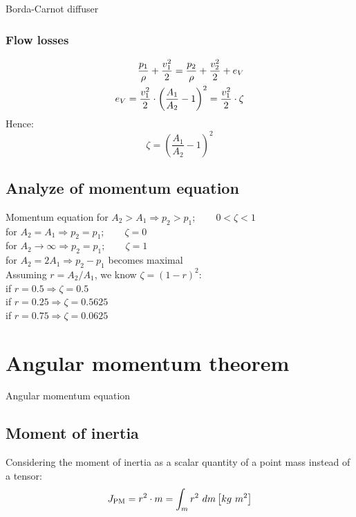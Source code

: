 \documentclass{article}
\begin{document}
\newpage
\begin{multicols}{2}
\setlength{\columnsep}{1pt}

\begin{examplebox}{Borda-Carnot diffuser}
    \subsubsection{Flow losses}
    \vspace{-0.5cm}
    \begin{align}
        \frac{p_1}{\rho} + \frac{v_1^2}{2} = \frac{p_2}{\rho} + \frac{v_2^2}{2} + e_V \notag \\
        e_V = \frac{v_1^2}{2} \cdot \left(\frac{A_1}{A_2}-1\right)^2 = \frac{v_1^2}{2}\cdot \zeta
    \end{align}
    Hence:
    \begin{equation}
        \zeta = \left(\frac{A_1}{A_2}-1\right)^2
    \end{equation}
\end{examplebox}

\subsection{Analyze of momentum equation}
\begin{theorybox}{Momentum equation}
    for $A_2 > A_1 \Longrightarrow p_2 > p_1;\qquad 0 < \zeta < 1$\\[1ex]
    for $A_2 = A_1 \Longrightarrow p_2 = p_1;\qquad \zeta = 0$\\[1ex]
    for $A_2 \to \infty \Longrightarrow p_2 = p_1;\qquad \zeta = 1$\\[1ex]
    for $A_2 = 2A_1 \Longrightarrow p_2 - p_1$ becomes maximal\\[3ex]
    Assuming $r=A_2/A_1$, we know $\zeta = \left(1-r\right)^2:$\\[1ex]
    if $r = 0.5 \Longrightarrow \zeta = 0.5$\\[1ex]
    if $r = 0.25 \Longrightarrow \zeta = 0.5625$\\[1ex]
    if $r = 0.75 \Longrightarrow \zeta = 0.0625$
\end{theorybox}

\section{Angular momentum theorem}
\begin{theorybox}{Angular momentum equation}
    \subsection{Moment of inertia}
    Considering the moment of inertia as a scalar quantity of a point mass
    instead of a tensor:
    \begin{equation}
        J_{\rm PM} = r^2\cdot m = \int_m r^2\ dm \left[kg\ m^2\right]
    \end{equation}


\end{theorybox}
\end{multicols}
\end{document}
